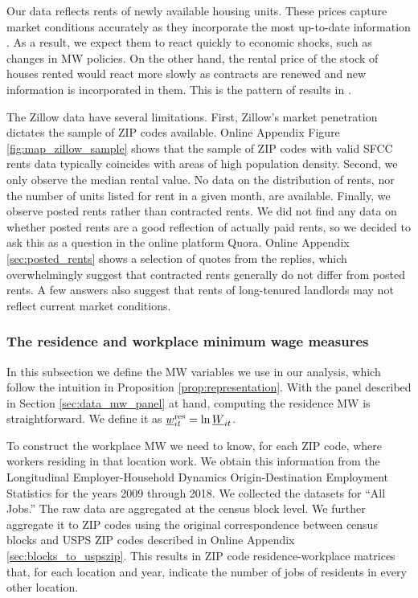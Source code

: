 Our data reflects rents of newly available housing units.
These prices capture market conditions accurately as they incorporate the most
up-to-date information \parencite{AmbroseEtAl2015}.
As a result, we expect them to react quickly to economic shocks, such as 
changes in MW policies.
On the other hand, the rental price of the stock of houses rented would react 
more slowly as contracts are renewed and new information is incorporated in them.
This is the pattern of results in \textcite{AgarwalEtAl2021}.

The Zillow data have several limitations.
First, Zillow's market penetration dictates the sample of ZIP codes available.
Online Appendix Figure \ref{fig:map_zillow_sample} shows that the sample of ZIP 
codes with valid SFCC rents data typically coincides with areas of high 
population density.
Second, we only observe the median rental value.
No data on the distribution of rents, nor the number of units listed for rent 
in a given month, are available.
Finally, we observe posted rents rather than contracted rents.
We did not find any data on whether posted rents are a good reflection of 
actually paid rents, so we decided to ask this as a question in the online 
platform Quora.
Online Appendix \ref{sec:posted_rents} shows a selection of quotes from the 
replies, which overwhelmingly suggest that contracted rents generally do not 
differ from posted rents.
A few answers also suggest that rents of long-tenured landlords may not
reflect current market conditions.

\subsubsection{The residence and workplace minimum wage measures}
\label{sec:data_mw_measures}

In this subsection we define the MW variables we use in our analysis,
which follow the intuition in Proposition \ref{prop:representation}.
With the panel described in Section \ref{sec:data_mw_panel} at hand, computing 
the residence MW is straightforward.
We define it as $\underline{w}^{\text{res}}_{it} = \ln \underline{W}_{it}$.

To construct the workplace MW we need to know, for each ZIP code, where workers 
residing in that location work.
We obtain this information from the Longitudinal Employer-Household 
Dynamics Origin-Destination Employment Statistics \parencite[LODES;][]{CensusLODES}
for the years 2009 through 2018.
We collected the datasets for ``All Jobs.''
The raw data are aggregated at the census block level. 
We further aggregate it to ZIP codes using the original correspondence between 
census blocks and USPS ZIP codes described in Online Appendix 
\ref{sec:blocks_to_uspszip}.
This results in ZIP code residence-workplace matrices that, for each location 
and year, indicate the number of jobs of residents in every other location.


